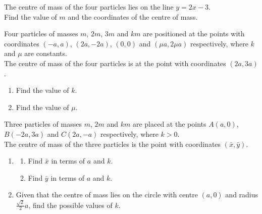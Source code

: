 \documentclass[leqno]{article}
\begin{document}
\begin{enumerate}[
  label=\textbf{\arabic*.},
  leftmargin=*,
  topsep=0pt,
  partopsep=0pt,
  parsep=0pt
]
The centre of mass of the four particles lies on the line $y = 2x - 3$. \\
Find the value of $m$ and the coordinates of the centre of mass.  \\

\newpage

\questionitem

Four particles of masses $m$, $2m$, $3m$ and $km$ are positioned at the points with coordinates $(-a, a)$, $(2a, -2a)$, $(0, 0)$ and $(\mu a, 2\mu a)$ respectively, where $k$ and $\mu$ are constants. \\

The centre of mass of the four particles is at the point with coordinates $(2a, 3a)$. \\

\begin{enumerate}[label=\textbf{(\alph*)}]
  \item Find the value of $k$.  \\
  \item Find the value of $\mu$.  \\
\end{enumerate}

\newpage

\questionitem

Three particles of masses $m$, $2m$ and $km$ are placed at the points $A(a,0)$, $B(-2a,3a)$ and $C(2a,-a)$ respectively, where $k>0$. \\

The centre of mass of the three particles is the point with coordinates $(\bar{x}, \bar{y})$. \\

\begin{enumerate}[label=\textbf{(\alph*)}]
  \item
  \begin{enumerate}[label=(\roman*)]
    \item Find $\bar{x}$ in terms of $a$ and $k$.
    \item Find $\bar{y}$ in terms of $a$ and $k$.
  \end{enumerate}
  \item Given that the centre of mass lies on the circle with centre $(a,0)$ and radius $\frac{\sqrt{2}}{2}a$, find the possible values of $k$.  
\end{enumerate}


\end{enumerate}
\end{document}
